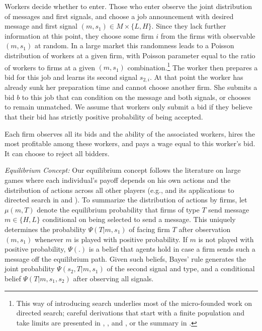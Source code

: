 \documentclass[12pt]{article}
\begin{document}
Workers decide whether to enter. Those who enter observe the joint distribution of
messages and first signals, and choose a job announcement with desired
message and first signal $(m,s_{1})\in M\times \{L,H\}$. Since they lack
further information at this point, they choose some firm $i$ from the firms
with observable $(m,s_{1})$ at random. In a large market this randomness
leads to a Poisson distribution of workers at a given firm, with Poisson
parameter equal to the ratio of workers to firms at a given $(m,s_{1})$
combination.\footnote{%
This way of introducing search underlies most of the micro-founded work on
directed search; careful derivations that start with a finite population
and take limits are presented in \cite{peters_1991}, \cite{peters_1997}, and \cite{burdett_etal2001}, or the summary in \cite{wright_etal2021}.} The worker then prepares a bid for
this job and learns its second signal $s_{2,i}$. At that point the worker
has already sunk her preparation time and cannot choose another firm. She
submits a bid $b$ to this job that can condition on the message and both
signals, or chooses to remain unmatched. We assume that workers only submit
a bid if they believe that their bid has strictly positive probability of being
accepted.

Each firm observes all its bids and the ability of the associated workers,
hires the most profitable among these workers, and pays a wage equal to this
worker's bid. It can choose to reject all bidders.

\textit{Equilibrium Concept:} Our equilibrium concept follows the literature on large games where each individual's payoff depends on his own actions and the distribution of actions across all other players (e.g., \cite{mas1984theorem} and its applications to directed search in \cite{eeckhout2010sorting} and \cite{peters2010noncontractible}). To summarize the distribution of actions by firms, let $\mu (m,T)$ denote the equilibrium probability
that firms of type $T$ send message $m\in \{H,L\}$ conditional on being
selected to send a message. This uniquely determines the probability $\Psi
(T|m,s_{1})$ of facing firm $T$ after observation $(m,s_{1})$ whenever $m$
is played with positive probability. If $m$ is not played with positive
probability, $\Psi (.)$ is a belief that agents hold in case a firm sends
such a message off the equilibrium path. Given such beliefs, Bayes' rule generates
the joint probability $\Psi (s_{2},T|m,s_{1})$ of the second signal and
type, and a conditional belief $\Psi (T|m,s_{1},s_{2})$ after observing all
signals.
\end{document}
